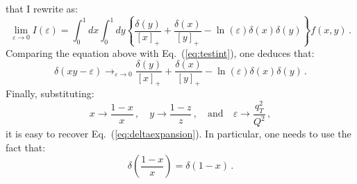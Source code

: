 \documentclass[10pt,a4paper]{article}
\begin{document}
that I rewrite as:
\begin{equation}
\lim_{\varepsilon\rightarrow 0}I(\varepsilon) =\int_0^1dx \int_0^1dy\left\{\frac{\delta(y)}{[x]_+}+\frac{\delta(x)}{[y]_+}-\ln\left(\varepsilon\right)\delta(x)\delta(y)\right\}f(x,y)\,.
\end{equation}
Comparing the equation above with Eq.~(\ref{eq:testint}), one deduces that:
\begin{equation}
\delta(xy-\varepsilon)\mathop{\longrightarrow}_{\varepsilon\rightarrow 0}
\frac{\delta(y)}{[x]_+}+\frac{\delta(x)}{[y]_+}-\ln\left(\varepsilon\right)\delta(x)\delta(y)\,.
\end{equation}
Finally, substituting:
\begin{equation}
x\rightarrow \frac{1-x}{x}\,,\quad y\rightarrow \frac{1-z}{z}\,,\quad\mbox{and}\quad\varepsilon\rightarrow\frac{q_T^2}{Q^2}\,,
\end{equation}
it is easy to recover Eq.~(\ref{eq:deltaexpansion}). In particular,
one needs to use the fact that:
\begin{equation}
\delta\left(\frac{1-x}{x}\right)=\delta(1-x)\,.
\end{equation}


\newpage
\end{document}
